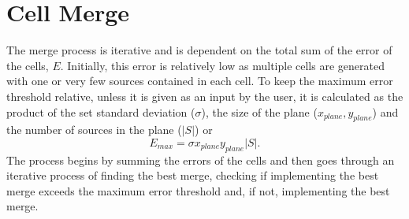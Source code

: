 \section{Cell Merge}
The merge process is iterative and is dependent on the total sum of the error of the cells, $E$. Initially, this error is relatively low as multiple cells are generated with one or very few sources contained in each cell. To keep the maximum error threshold relative, unless it is given as an input by the user, it is calculated as the product of the set standard deviation ($\sigma$), the size of the plane ($x_{plane},y_{plane}$) and the number of sources in the plane ($|S|$) or 
\begin{equation}
 E_{max} = \sigma x_{plane}y_{plane}|S|.
\end{equation}
The process begins by summing the errors of the cells and then goes through an iterative process of finding the best merge, checking if implementing the best merge exceeds the maximum error threshold and, if not, implementing the best merge.

